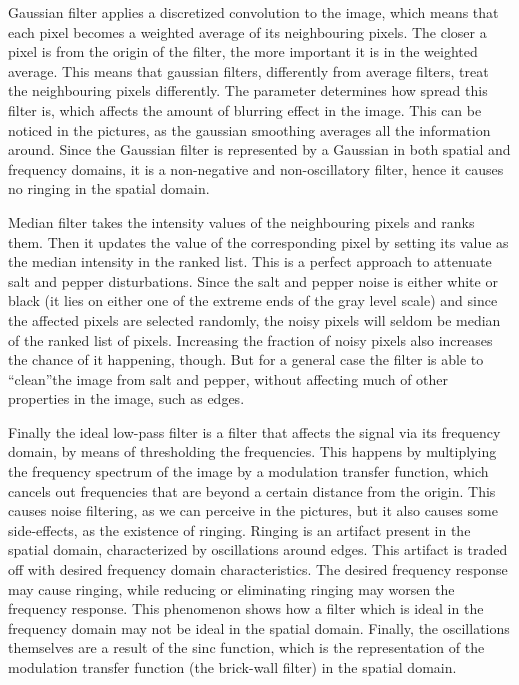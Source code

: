 \documentclass{article}
\begin{document}
\begin{enumerate}
Gaussian filter applies a discretized convolution to the image, which means that each pixel becomes a weighted average of its neighbouring pixels. The closer a pixel is from the origin of the filter, the more important it is in the weighted average. This means that gaussian filters, differently from average filters, treat the neighbouring pixels differently. The parameter determines how spread this filter is, which affects the amount of blurring effect in the image. This can be noticed in the pictures, as the gaussian smoothing averages all the information around. Since the Gaussian filter is represented by a Gaussian in both spatial and frequency domains, it is a non-negative and non-oscillatory filter, hence it causes no ringing in the spatial domain.

Median filter takes the intensity values of the neighbouring pixels and ranks them. Then it updates the value of the corresponding pixel by setting its value as the median intensity in the ranked list. This is a perfect approach to attenuate salt and pepper disturbations. Since the salt and pepper noise is either white or black (it lies on either one of the extreme ends of the gray level scale) and since the affected pixels are selected randomly, the noisy pixels will seldom be median of the ranked list of pixels. Increasing the fraction of noisy pixels also increases the chance of it happening, though. But for a general case the filter is able to ``clean''the image from salt and pepper, without affecting much of other properties in the image, such as edges.

Finally the ideal low-pass filter is a filter that affects the signal via its frequency domain, by means of thresholding the frequencies. This happens by multiplying the frequency spectrum of the image by a modulation transfer function, which cancels out frequencies that are beyond a certain distance from the origin. This causes noise filtering, as we can perceive in the pictures, but it also causes some side-effects, as the existence of ringing. Ringing is an artifact present in the spatial domain, characterized by oscillations around edges. This artifact is traded off with desired frequency domain characteristics. The desired frequency response may cause ringing, while reducing or eliminating ringing may worsen the frequency response. This phenomenon shows how a filter which is ideal in the frequency domain may not be ideal in the spatial domain. Finally, the oscillations themselves are a result of the sinc function, which is the representation of the modulation transfer function (the brick-wall filter) in the spatial domain.


\end{enumerate}
\end{document}
